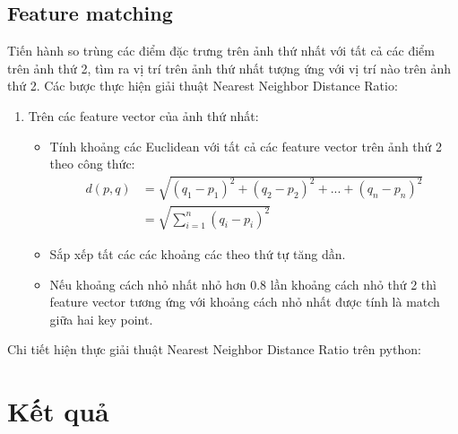 \documentclass[11pt]{article}
\begin{document}
\subsection*{Feature matching}
Tiến hành so trùng các điểm đặc trưng trên ảnh thứ nhất với tất cả các điểm trên ảnh thứ 2, tìm ra vị trí trên ảnh thứ nhất tượng ứng với vị trí nào trên ảnh thứ 2.
Các bược thực hiện giải thuật Nearest Neighbor Distance Ratio:
\begin{enumerate}
    \item Trên các feature vector của ảnh thứ nhất:
        \begin{itemize}
            \item Tính khoảng các Euclidean với tất cả các feature vector trên ảnh thứ 2 theo công thức:
                \begin{equation*}
                    \begin{split}
                        d(p, q) & = \sqrt{(q_1 - p_1)^2 + (q_2 - p_2)^2 + ... + (q_n - p_n)^2} \\
                                & = \sqrt{\sum_{i=1}^{n} (q_i - p_i)^2}
                    \end{split}
                \end{equation*}
            \item Sắp xếp tất các các khoảng các theo thứ tự tăng dần.
            \item Nếu khoảng cách nhỏ nhất nhỏ hơn 0.8 lần khoảng cách nhỏ thứ 2 thì feature vector tương ứng với khoảng cách nhỏ nhất được tính là match giữa hai key point.
        \end{itemize}
\end{enumerate}

Chi tiết hiện thực giải thuật Nearest Neighbor Distance Ratio trên python:

\section*{Kết quả}
\end{document}
